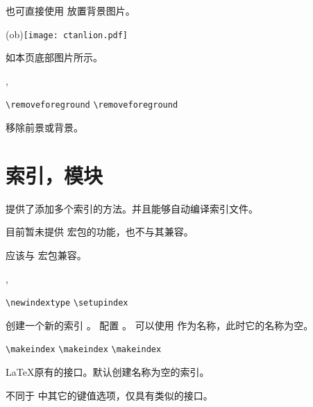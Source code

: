 \documentclass[twoside]{book}
\def\xampletext{\par}
\def\xampleprint{\xamplecode \xampleline \xampletext}
\begin{document}
也可直接使用  放置背景图片。
\begin{xample}
\background(ob){\texttt{[image: ctanlion.pdf]}}
\stopxamplecode
\xampleprint
如本页底部图片所示。
\end{xample}


\begin{function}{\removeforeground,\removebackground}
  \begin{syntax}
    \verb|\removeforeground|
    \verb|\removeforeground| 
  \end{syntax}
移除前景或背景。
\end{function}


\section{索引，模块}

\WhuTeX 提供了添加多个索引的方法。并且能够自动编译索引文件。

目前暂未提供  宏包的功能，也不与其兼容。

应该与  宏包兼容。

\begin{function}{\newindextype,\setupindex}
  \begin{syntax}
    \verb|\newindextype|  
    \verb|\setupindex|    
  \end{syntax}
 创建一个新的索引 。
 配置 。
 可以使用  作为名称，此时它的名称为空。
\end{function}

\begin{function}{\makeindex}
  \begin{syntax}
    \verb|\makeindex|
    \verb|\makeindex| 
    \verb|\makeindex|  
  \end{syntax}
\LaTeX 原有的接口。默认创建名称为空的索引。
\end{function}

 不同于 \WhuTeX 中其它的键值选项，仅具有类似的接口。
\end{document}
